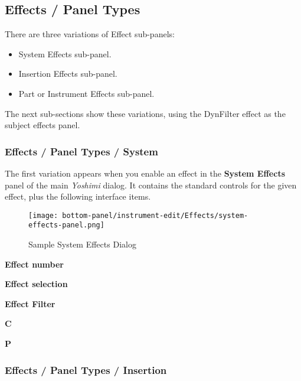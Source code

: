\subsection{Effects / Panel Types}
\label{subsec:effects_paneltypes}

   There are three variations of Effect sub-panels:

   \begin{itemize}
      \item System Effects sub-panel.
      \item Insertion Effects sub-panel.
      \item Part or Instrument Effects sub-panel.
   \end{itemize}

   The next sub-sections show these variations, using the DynFilter effect
   as the subject effects panel.

\subsubsection{Effects / Panel Types / System }
\label{subsubsec:effects_paneltypes_system}

   The first variation
   appears when you enable an effect in the
   \textbf{System Effects}
   panel of the main \textsl{Yoshimi} dialog.  It contains the standard
   controls for the given effect, plus the following interface items.

\begin{figure}[H]
   \centering 
   \texttt{[image: bottom-panel/instrument-edit/Effects/system-effects-panel.png]}
   \caption{Sample System Effects Dialog}
   \label{fig:sample_system_effects_dialog}
\end{figure}
   
   \begin{enumber}
      \item \textbf{Effect number}
      \item \textbf{Effect selection}
      \item \textbf{Effect Filter}
      \item \textbf{C}
      \item \textbf{P}
   \end{enumber}

\subsubsection{Effects / Panel Types / Insertion }
\label{subsubsec:effects_paneltypes_insertion}

